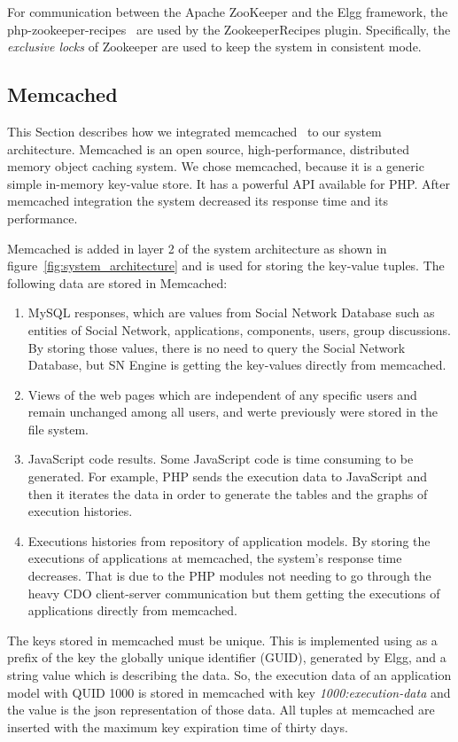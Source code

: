 For communication between the Apache ZooKeeper and the Elgg framework, the php-zookeeper-recipes~\cite{zookeeper_recipes_url} are used by the ZookeeperRecipes plugin. Specifically, the {\it exclusive locks} of Zookeeper are used to keep the system in consistent mode.

\subsection{Memcached}
\label{sec:memcache_implementation}
This Section describes how we integrated memcached~\cite{memcache_url} to our system architecture. Memcached is an open source, high-performance, distributed memory object caching system. We chose memcached, because it is a generic simple in-memory key-value store. It has a powerful API available for PHP. After memcached integration the system decreased its response time and its performance.

Memcached is added in layer 2 of the system architecture as shown in figure~\ref{fig:system_architecture} and is used for storing the key-value tuples. The following data are stored in Memcached: 
\begin{enumerate}
\item MySQL responses, which are values from Social Network Database such as entities of Social Network, applications, components, users, group discussions. By storing those values, there is no need to query the Social Network Database, but SN Engine is getting the key-values directly from memcached.
\item Views of the web pages which are independent of any specific users and remain unchanged among all users, and werte previously were stored in the file system.
\item JavaScript code results. Some JavaScript code is time consuming to be generated. For example, PHP sends the execution data to JavaScript and then it iterates the data in order to generate the tables and the graphs of execution histories.
\item Executions histories from repository of application models. By storing the executions of applications at memcached, the system's response time decreases. That is due to the PHP modules not needing to go through the heavy CDO client-server communication but them getting the executions of applications directly from memcached.
\end{enumerate}

The keys stored in memcached must be unique. This is implemented using as a prefix of the key the globally unique identifier (GUID), generated by Elgg, and a string value which is describing the data. So, the execution data of an application model with QUID 1000 is stored in memcached with key {\it 1000:execution-data} and the value is the json representation of those data. All tuples at memcached are inserted with the maximum key expiration time of thirty days.

